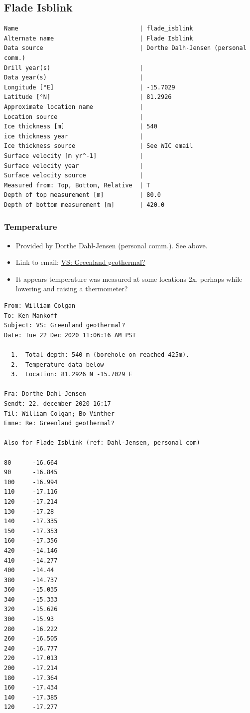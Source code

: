\documentclass[article,a4paper,times,11pt,twoside]{article}
\begin{document}
\subsection{Flade Isblink}
\label{sec:orgc419525}
\begin{verbatim}
Name                                  | flade_isblink
Alternate name                        | Flade Isblink
Data source                           | Dorthe Dalh-Jensen (personal comm.)
Drill year(s)                         | 
Data year(s)                          | 
Longitude [°E]                        | -15.7029
Latitude [°N]                         | 81.2926
Approximate location name             | 
Location source                       | 
Ice thickness [m]                     | 540
ice thickness year                    | 
Ice thickness source                  | See WIC email
Surface velocity [m yr^-1]            | 
Surface velocity year                 | 
Surface velocity source               | 
Measured from: Top, Bottom, Relative  | T
Depth of top measurement [m]          | 80.0
Depth of bottom measurement [m]       | 420.0
\end{verbatim}

\subsubsection{Temperature}
\label{sec:org8f4827c}

\begin{itemize}
\item Provided by Dorthe Dahl-Jensen (personal comm.). See above.
\item Link to email: \href{msgid:AM0PR04MB61299127D5D5EF0A7269A855A2DF0@AM0PR04MB6129.eurprd04.prod.outlook.com}{VS: Greenland geothermal?}
\item It appears temperature was measured at some locations 2x, perhaps while lowering and raising a thermometer?
\end{itemize}

\begin{verbatim}
From: William Colgan
To: Ken Mankoff
Subject: VS: Greenland geothermal?
Date: Tue 22 Dec 2020 11:06:16 AM PST

  1.  Total depth: 540 m (borehole on reached 425m).
  2.  Temperature data below
  3.  Location: 81.2926 N -15.7029 E

Fra: Dorthe Dahl-Jensen
Sendt: 22. december 2020 16:17
Til: William Colgan; Bo Vinther
Emne: Re: Greenland geothermal?

Also for Flade Isblink (ref: Dahl-Jensen, personal com)

80      -16.664
90      -16.845
100     -16.994
110     -17.116
120     -17.214
130     -17.28
140     -17.335
150     -17.353
160     -17.356
420     -14.146
410     -14.277
400     -14.44
380     -14.737
360     -15.035
340     -15.333
320     -15.626
300     -15.93
280     -16.222
260     -16.505
240     -16.777
220     -17.013
200     -17.214
180     -17.364
160     -17.434
140     -17.385
120     -17.277
\end{verbatim}
\end{document}
